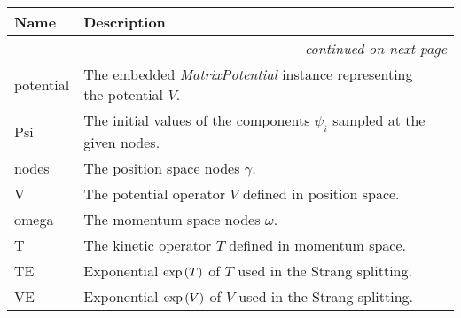     \vspace{-1cm}
\hspace{\varindent}\begin{longtable}{|p{\varnamewidth}|p{\vardescrwidth}|l}
\cline{1-2}
\cline{1-2} \centering \textbf{Name} & \centering \textbf{Description}& \\
\cline{1-2}
\endhead\cline{1-2}\multicolumn{3}{r}{\small\textit{continued on next page}}\\\endfoot\cline{1-2}
\endlastfoot\raggedright p\-o\-t\-e\-n\-t\-i\-a\-l\- & The embedded \textit{MatrixPotential} instance representing the
          potential $V$.&\\
\cline{1-2}
\raggedright P\-s\-i\- & The initial values of the components $\psi_i$
          sampled at the given nodes.&\\
\cline{1-2}
\raggedright n\-o\-d\-e\-s\- & The position space nodes $\gamma$.&\\
\cline{1-2}
\raggedright V\- & The potential operator $V$ defined in position space.&\\
\cline{1-2}
\raggedright o\-m\-e\-g\-a\- & The momentum space nodes $\omega$.&\\
\cline{1-2}
\raggedright T\- & The kinetic operator $T$ defined in momentum space.&\\
\cline{1-2}
\raggedright T\-E\- & Exponential $\exp\left( T \right)$ of
          $T$ used in the Strang splitting.&\\
\cline{1-2}
\raggedright V\-E\- & Exponential $\exp\left( V \right)$ of
          $V$ used in the Strang splitting.&\\
\cline{1-2}
\end{longtable}

